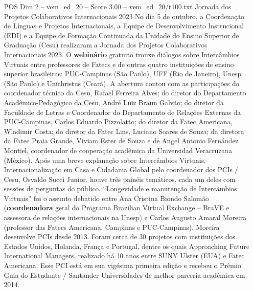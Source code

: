 \begin{textsample}{POS Dim 2 – vem\_ed\_20 – Score 3.00 – vem\_ed\_20/t100.txt}  \label{ex:f2_pos_102}
Jornada dos Projetos Colaborativos Internacionais 2023 No dia 5 de outubro, a Coordenação de Línguas e Projetos Internacionais, a Equipe de Desenvolvimento Instrucional (EDI) e a Equipe de Formação Continuada da Unidade do Ensino Superior de Graduação (Cesu) realizaram a Jornada dos Projetos Colaborativos Internacionais 2023.
O \textbf{webinário} gratuito trouxe diálogos sobre Intercâmbios Virtuais entre professores de Fatecs e de outras quatro instituições de ensino superior brasileiras: PUC-Campinas (São Paulo), UFF (Rio de Janeiro), Unesp (São Paulo) e Unichristus (Ceará).
A abertura contou com as participações do coordenador técnico da Cesu, Rafael Ferreira Alves; do diretor do Departamento Acadêmico-Pedagógico da Cesu, André Luiz Braun Galvão; do diretor da Faculdade de Letras e Coordenador do Departamento de Relações Externas da PUC-Campinas, Carlos Eduardo Pizzolatto; do diretor da Fatec Americana, Wladimir Costa; do diretor da Fatec Lins, Luciano Soares de Souza; da diretora da Fatec Praia Grande, Viviam Ester de Souza e de Angel Antonio Fernández Montiel, coordenador de cooperação acadêmica da Universidad Veracruzana (México).
Após uma breve explanação sobre Intercâmbios Virtuais, Internacionalização em Casa e Cidadania Global pelo coordenador dos PCIs / Cesu, Osvaldo Succi Junior, houve três painéis temáticos, cada um deles com sessões de perguntas do público. “Longevidade e manutenção de Intercâmbios Virtuais” foi o assunto debatido entre Ana Cristina Biondo Salomão (\textbf{coordenadora} geral do Programa Brazilian Virtual Exchange – BraVE e assessora de relações internacionais na Unesp) e Carlos Augusto Amaral Moreira (professor das Fatecs Americana, Campinas e PUC-Campinas).
Moreira desenvolve PCIs desde 2013.
Foram cerca de 30 projetos com instituições dos Estados Unidos, Holanda, França e Portugal, dentre os quais Approaching Future International Managers, realizado há 10 anos entre SUNY Ulster (EUA) e Fatec Americana.
Esse PCI está em sua vigésima primeira edição e recebeu o Prêmio Guia do Estudante / Santander Universidades de melhor parceria acadêmica em 2014.

\end{textsample}
